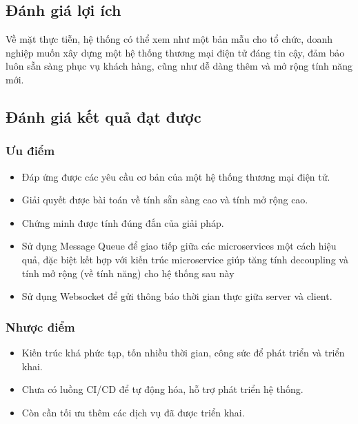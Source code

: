 \subsection{Đánh giá lợi ích}
\noindent Về mặt thực tiễn, hệ thống có thể xem như một bản mẫu cho tổ chức, doanh nghiệp muốn xây dựng một hệ 
thống thương mại điện tử đáng tin cậy, đảm bảo luôn sẵn sàng phục vụ khách hàng, cũng như dễ dàng thêm và mở 
rộng tính năng mới.
\subsection{Đánh giá kết quả đạt được}
\subsubsection{Ưu điểm}
\begin{itemize}
    \item Đáp ứng được các yêu cầu cơ bản của một hệ thống thương mại điện tử.
    \item Giải quyết được bài toán về tính sẵn sàng cao và tính mở rộng cao.
    \item Chứng minh được tính đúng đắn của giải pháp.
    \item Sử dụng Message Queue để giao tiếp giữa các microservices một cách hiệu quả, đặc biệt kết hợp với kiến trúc microservice giúp tăng tính decoupling và tính mở rộng (về tính năng) cho hệ thống sau này
    \item Sử dụng Websocket để gửi thông báo thời gian thực giữa server và client.
\end{itemize}
\subsubsection{Nhược điểm}
\begin{itemize}
    \item Kiến trúc khá phức tạp, tốn nhiều thời gian, công sức để phát triển và triển khai.
    \item Chưa có luồng CI/CD để tự động hóa, hỗ trợ phát triển hệ thống.
    \item Còn cần tối ưu thêm các dịch vụ đã được triển khai.
\end{itemize}

